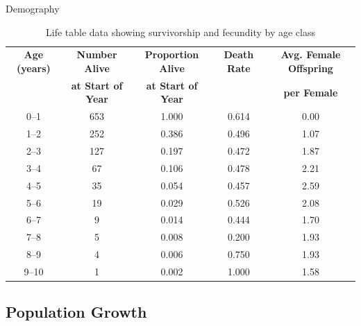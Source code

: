 \documentclass[10pt]{article}
\begin{document}
\begin{core}{Demography}
\begin{enumerate}
      \begin{table}[H]
        \centering
        \begin{tabular}{ccccc}
            \hline
            \textbf{Age (years)} & \textbf{Number Alive} & \textbf{Proportion Alive} & \textbf{Death Rate} & \textbf{Avg. Female Offspring} \\
                                 & \textbf{at Start of Year} & \textbf{at Start of Year} & & \textbf{per Female} \\
            \hline
            0--1  & 653 & 1.000 & 0.614 & 0.00 \\
            1--2  & 252 & 0.386 & 0.496 & 1.07 \\
            2--3  & 127 & 0.197 & 0.472 & 1.87 \\
            3--4  &  67 & 0.106 & 0.478 & 2.21 \\
            4--5  &  35 & 0.054 & 0.457 & 2.59 \\
            5--6  &  19 & 0.029 & 0.526 & 2.08 \\
            6--7  &   9 & 0.014 & 0.444 & 1.70 \\
            7--8  &   5 & 0.008 & 0.200 & 1.93 \\
            8--9  &   4 & 0.006 & 0.750 & 1.93 \\
            9--10 &   1 & 0.002 & 1.000 & 1.58 \\
            \hline
        \end{tabular}
        \caption{Life table data showing survivorship and fecundity by age class}
        \label{tab:life_table}
      \end{table}

    \end{enumerate}

  \end{core}

  \subsection{Population Growth}
\end{document}
